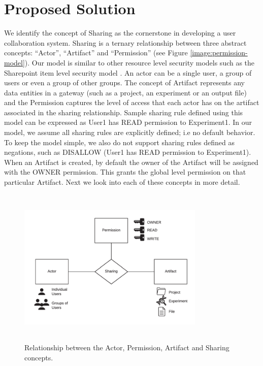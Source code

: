 \documentclass[sigconf]{acmart}
\begin{document}
\section{Proposed Solution}
We identify the concept of Sharing as the cornerstone in developing a user collaboration system. Sharing is a ternary relationship between three abstract concepts: ``Actor'', ``Artifact'' and ``Permission'' (see Figure \ref{image:permission-model}). Our model is similar to other resource level security models such as the Sharepoint item level security model \cite{sharePointSecurity}. An actor can be a single user, a group of users or even a group of other groups. The concept of Artifact represents any data entities in a gateway (such as a project, an experiment or an output file) and the Permission captures the level of access that each actor has on the artifact associated in the sharing relationship. Sample sharing rule defined using this model can be expressed as User1 has READ permission to Experiment1. In our model, we assume all sharing rules are explicitly defined; i.e no default behavior. To keep the model simple, we also do not support sharing rules defined as negations, such as DISALLOW (User1 has READ permission to Experiment1). When an Artifact is created, by default the owner of the Artifact will be assigned with the OWNER permission. This grants the global level permission on that particular Artifact. Next we look into each of these concepts in more detail.

\begin{figure}
\includegraphics[height=3in, width=3.5in]{figures/sharing-concepts.pdf}
\caption{Relationship between the Actor, Permission, Artifact and Sharing concepts.}
\end{figure}\label{image:permission-model}
\end{document}
